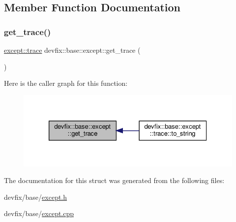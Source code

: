 \subsection{Member Function Documentation}
\mbox{\label{structdevfix_1_1base_1_1except_a720b5e4d1edb889d3ac81b6fd6c18715}} 
\subsubsection{\texorpdfstring{get\+\_\+trace()}{get\_trace()}}
{\footnotesize\ttfamily \hyperlink{structdevfix_1_1base_1_1except_1_1trace}{except\+::trace} devfix\+::base\+::except\+::get\+\_\+trace (\begin{DoxyParamCaption}{ }\end{DoxyParamCaption})\hspace{0.3cm}{\ttfamily [static]}}

Here is the caller graph for this function\+:\nopagebreak
\begin{figure}[H]
\begin{center}
\leavevmode
\includegraphics[width=326pt]{structdevfix_1_1base_1_1except_a720b5e4d1edb889d3ac81b6fd6c18715_icgraph}
\end{center}
\end{figure}


The documentation for this struct was generated from the following files\+:\begin{DoxyCompactItemize}
\item 
devfix/base/\hyperlink{except_8h}{except.\+h}\item 
devfix/base/\hyperlink{except_8cpp}{except.\+cpp}\end{DoxyCompactItemize}
